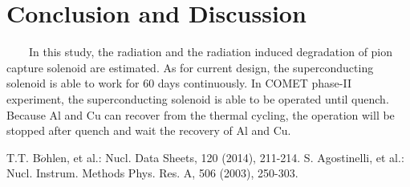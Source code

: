 \documentclass[a4paper, 10pt, twocolumn]{article}
\begin{document}
\section{Conclusion and Discussion}
~~~~In this study, the radiation and the radiation induced degradation of pion capture solenoid are estimated.
As for current design, the superconducting solenoid is able to work for 60 days continuously.
In COMET phase-II experiment, the superconducting solenoid is able to be operated until quench.
Because Al and Cu can recover from the thermal cycling, the operation will be stopped after quench and wait the recovery of Al and Cu.

\begin{thebibliography}{10}
	 T.T. B$\ddot{o}$hlen, et al.: Nucl. Data Sheets, 120 (2014), 211-214.
	 S. Agostinelli, et al.: Nucl. Instrum. Methods Phys. Res. A, 506 (2003), 250-303.
\end{thebibliography}
\end{document}
